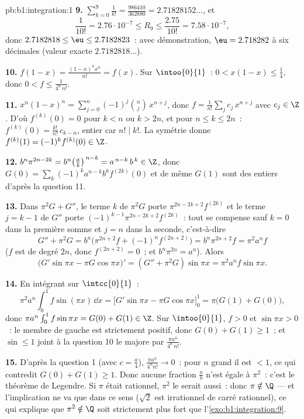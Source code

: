 \begin{solution}{pb:b1:integration:1}
\textbf{9.} $\sum_{k=0}^{9} \frac{1}{k!} = \frac{986410}{362880}
= 2.71828152\dots$, et
\[
\frac{1}{10!} = 2.76\cdot10^{-7} \leq R_9 \leq
\frac{2.75}{10!} = 7.58\cdot10^{-7} ,
\]
donc $2.7182818 \leq \eu \leq 2.7182823$~: avec démonstration, $\eu =
2.718282$ à six décimales (valeur exacte $2.7182818\dots$).

\textbf{10.} $f(1 - x) = \frac{(1-x)^n x^n}{n!} = f(x)$. Sur
$\intoo{0}{1}$~: $0 < x(1-x) \leq \frac14$, donc $0 < f \leq
\frac{1}{4^n\,n!}$.

\textbf{11.} $x^n(1-x)^n = \sum_{j=0}^{n} (-1)^j\binom
nj\,x^{n+j}$, donc $f = \frac{1}{n!}\sum_j c_j\,x^{n+j}$ avec
$c_j \in \Z$. D'où $f^{(k)}(0) = 0$ pour $k < n$ ou $k > 2n$,
et pour $n \leq k \leq 2n$~: $f^{(k)}(0) = \frac{k!}{n!}\,
c_{k-n}$, entier car $n! \mid k!$. La symétrie donne
$f^{(k)}(1) = (-1)^k f^{(k)}(0) \in \Z$.

\textbf{12.} $b^n \pi^{2n-2k} = b^n\bigl(\frac
ab\bigr)^{\,n-k} = a^{\,n-k}\,b^{\,k} \in \Z$, donc $G(0) =
\sum_k (-1)^k a^{n-k} b^k f^{(2k)}(0)$ et de même $G(1)$ sont des
entiers d'après la question 11.

\textbf{13.} Dans $\pi^2 G + G''$, le terme $k$ de $\pi^2 G$
porte $\pi^{2n-2k+2}f^{(2k)}$ et le terme $j = k - 1$ de
$G''$ porte $(-1)^{k-1}\pi^{2n-2k+2}f^{(2k)}$~: tout se compense
sauf $k = 0$ dans la première somme et $j = n$ dans la seconde,
c'est-à-dire
\[
G'' + \pi^2 G = b^n\bigl(\pi^{2n+2} f + (-1)^n f^{(2n+2)}\bigr)
= b^n \pi^{2n+2} f = \pi^2 a^n f
\]
($f$ est de degré $2n$, donc $f^{(2n+2)} = 0$~; et $b^n\pi^{2n} =
a^n$). Alors
\[
\bigl(G'\sin\pi x - \pi G\cos\pi x\bigr)'
= (G'' + \pi^2 G)\sin \pi x = \pi^2 a^n f\sin\pi x .
\]

\textbf{14.} En intégrant sur $\intcc{0}{1}$~:
\[
\pi^2 a^n \int_0^1 f\sin(\pi x)\,\dd x
= \bigl[G'\sin\pi x - \pi G\cos\pi x\bigr]_0^1
= \pi\bigl(G(1) + G(0)\bigr) ,
\]
donc $\pi a^n \int_0^1 f\sin\pi x = G(0) + G(1) \in \Z$. Sur
$\intoo{0}{1}$, $f > 0$ et $\sin\pi x > 0$~: le membre de gauche
est strictement positif, donc $G(0) + G(1) \geq 1$~; et $\sin \leq
1$ joint à la question 10 le majore par $\frac{\pi a^n}{4^n\,n!}$.

\textbf{15.} D'après la question 1 (avec $c = \frac a4$),
$\frac{\pi a^n}{4^n n!} \to 0$~: pour $n$ grand il est $< 1$, ce qui
contredit $G(0) + G(1) \geq 1$. Donc aucune fraction $\frac ab$
n'est égale à $\pi^2$~: c'est le théorème de Legendre. Si $\pi$
était rationnel, $\pi^2$ le serait aussi~: donc $\pi \notin \Q$ ---
et l'implication ne va que dans ce sens ($\sqrt2$ est irrationnel de
carré rationnel), ce qui explique que $\pi^2 \notin \Q$ soit
strictement plus fort que l'\cref{exo:b1:integration:9}.


\end{solution}
